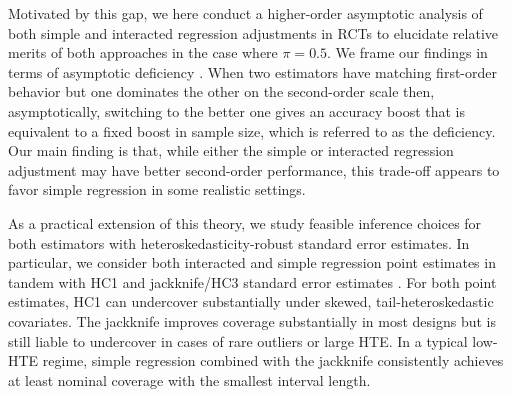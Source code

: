 \documentclass{article}
\theoremstyle{plain}
\theoremstyle{definition}
\theoremstyle{remark}
\begin{document}

Motivated by this gap, we here conduct a higher-order asymptotic analysis of both simple and interacted regression adjustments in RCTs to elucidate relative merits of both approaches in the case where $\pi = 0.5$. We frame our findings in terms of asymptotic deficiency \citep{HodgesLehmann1970}. When two estimators have matching first-order behavior but one dominates the other on the second-order scale then, asymptotically, switching to the better one gives an accuracy boost that is equivalent to a fixed boost in sample size, which is referred to as the deficiency. Our main finding is that, while either the simple or interacted regression adjustment may have better second-order performance, this trade-off appears to favor simple regression in some realistic settings. 

As a practical extension of this theory, we study feasible inference choices for both estimators with heteroskedasticity-robust standard error estimates. In particular, we consider both interacted and simple regression point estimates in tandem with HC1 and jackknife/HC3 standard error estimates \citep{EfronStein1981,MacKinnonWhite1985}. For both point estimates, HC1 can undercover substantially under skewed, tail-heteroskedastic covariates. The jackknife improves coverage substantially in most designs but is still liable to undercover in cases of rare outliers or large HTE. In a typical low-HTE regime, simple regression combined with the jackknife consistently achieves at least nominal coverage with the smallest interval length.
\end{document}
